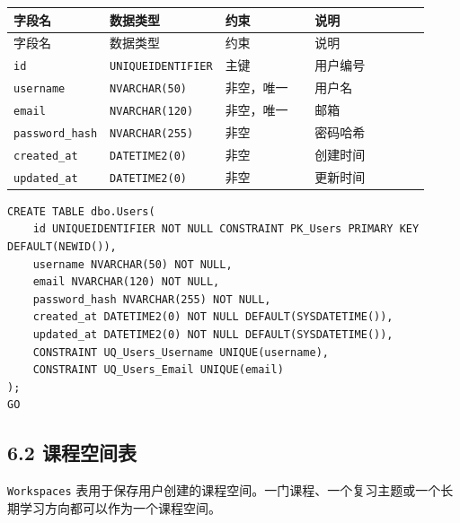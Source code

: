 \documentclass[10pt,a4paper,fontset=none]{ctexart}
\begin{document}
\begingroup\scriptsize
\renewcommand{\arraystretch}{1.18}
\setlength{\LTleft}{0pt}
\setlength{\LTright}{0pt}
\begin{longtable}{>{\raggedright\arraybackslash}p{0.20\linewidth}>{\raggedright\arraybackslash}p{0.16\linewidth}>{\raggedright\arraybackslash}p{0.24\linewidth}>{\raggedright\arraybackslash}p{0.32\linewidth}}
\toprule
字段名 & 数据类型 & 约束 & 说明 \\
\midrule
\endfirsthead
\toprule
字段名 & 数据类型 & 约束 & 说明 \\
\midrule
\endhead
\texttt{id} & \texttt{UNIQUEIDENTIFIER} & 主键 & 用户编号 \\
\texttt{username} & \texttt{NVARCHAR(50)} & 非空，唯一 & 用户名 \\
\texttt{email} & \texttt{NVARCHAR(120)} & 非空，唯一 & 邮箱 \\
\texttt{password\_hash} & \texttt{NVARCHAR(255)} & 非空 & 密码哈希 \\
\texttt{created\_at} & \texttt{DATETIME2(0)} & 非空 & 创建时间 \\
\texttt{updated\_at} & \texttt{DATETIME2(0)} & 非空 & 更新时间 \\
\bottomrule
\end{longtable}
\endgroup


\begin{Verbatim}[fontsize=\scriptsize,frame=single]
CREATE TABLE dbo.Users(
    id UNIQUEIDENTIFIER NOT NULL CONSTRAINT PK_Users PRIMARY KEY DEFAULT(NEWID()),
    username NVARCHAR(50) NOT NULL,
    email NVARCHAR(120) NOT NULL,
    password_hash NVARCHAR(255) NOT NULL,
    created_at DATETIME2(0) NOT NULL DEFAULT(SYSDATETIME()),
    updated_at DATETIME2(0) NOT NULL DEFAULT(SYSDATETIME()),
    CONSTRAINT UQ_Users_Username UNIQUE(username),
    CONSTRAINT UQ_Users_Email UNIQUE(email)
);
GO
\end{Verbatim}

\subsection*{6.2 课程空间表}

\texttt{Workspaces} 表用于保存用户创建的课程空间。一门课程、一个复习主题或一个长期学习方向都可以作为一个课程空间。\par
\end{document}
